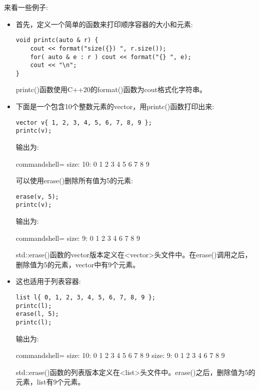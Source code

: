 来看一些例子:

\begin{itemize}
\item 
首先，定义一个简单的函数来打印顺序容器的大小和元素:

\begin{lstlisting}[style=styleCXX]
void printc(auto & r) {
	cout << format("size({}) ", r.size());
	for( auto & e : r ) cout << format("{} ", e);
	cout << "\n";
}
\end{lstlisting}

printc()函数使用C++20的format()函数为cout格式化字符串。

\item 
下面是一个包含10个整数元素的vector，用printc()函数打印出来:

\begin{lstlisting}[style=styleCXX]
vector v{ 1, 2, 3, 4, 5, 6, 7, 8, 9 };
printc(v);
\end{lstlisting}

输出为:

\begin{tcblisting}{commandshell={}}
size: 10: 0 1 2 3 4 5 6 7 8 9
\end{tcblisting}

可以使用erase()删除所有值为5的元素:

\begin{lstlisting}[style=styleCXX]
erase(v, 5);
printc(v);
\end{lstlisting}

输出为:

\begin{tcblisting}{commandshell={}}
size: 9: 0 1 2 3 4 6 7 8 9
\end{tcblisting}

std::erase()函数的vector版本定义在<vector>头文件中。在erase()调用之后，删除值为5的元素，vector中有9个元素。

\item 
这也适用于列表容器:

\begin{lstlisting}[style=styleCXX]
list l{ 0, 1, 2, 3, 4, 5, 6, 7, 8, 9 };
printc(l);
erase(l, 5);
printc(l);
\end{lstlisting}

输出为:

\begin{tcblisting}{commandshell={}}
size: 10: 0 1 2 3 4 5 6 7 8 9
size: 9: 0 1 2 3 4 6 7 8 9
\end{tcblisting}

std::erase()函数的列表版本定义在<list>头文件中。erase()之后，删除值为5的元素，list有9个元素。


\end{itemize}

